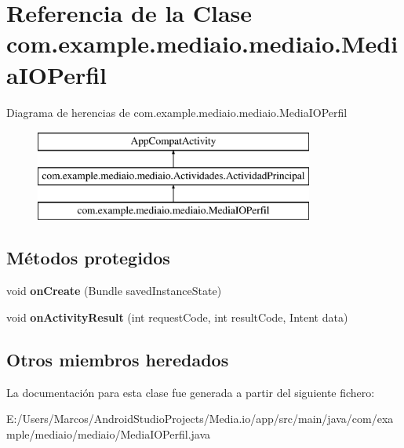 \hypertarget{classcom_1_1example_1_1mediaio_1_1mediaio_1_1_media_i_o_perfil}{}\section{Referencia de la Clase com.\+example.\+mediaio.\+mediaio.\+Media\+I\+O\+Perfil}
\label{classcom_1_1example_1_1mediaio_1_1mediaio_1_1_media_i_o_perfil}
Diagrama de herencias de com.\+example.\+mediaio.\+mediaio.\+Media\+I\+O\+Perfil\begin{figure}[H]
\begin{center}
\leavevmode
\includegraphics[height=3.000000cm]{classcom_1_1example_1_1mediaio_1_1mediaio_1_1_media_i_o_perfil}
\end{center}
\end{figure}
\subsection*{Métodos protegidos}
\begin{DoxyCompactItemize}
\item 
\mbox{\label{classcom_1_1example_1_1mediaio_1_1mediaio_1_1_media_i_o_perfil_a800db037e22311f3490a9ff9d8f36e50}} 
void {\bfseries on\+Create} (Bundle saved\+Instance\+State)
\item 
\mbox{\label{classcom_1_1example_1_1mediaio_1_1mediaio_1_1_media_i_o_perfil_ade7cb61e291925f56204763b8d7d4409}} 
void {\bfseries on\+Activity\+Result} (int request\+Code, int result\+Code, Intent data)
\end{DoxyCompactItemize}
\subsection*{Otros miembros heredados}


La documentación para esta clase fue generada a partir del siguiente fichero\+:\begin{DoxyCompactItemize}
\item 
E\+:/\+Users/\+Marcos/\+Android\+Studio\+Projects/\+Media.\+io/app/src/main/java/com/example/mediaio/mediaio/Media\+I\+O\+Perfil.\+java\end{DoxyCompactItemize}

